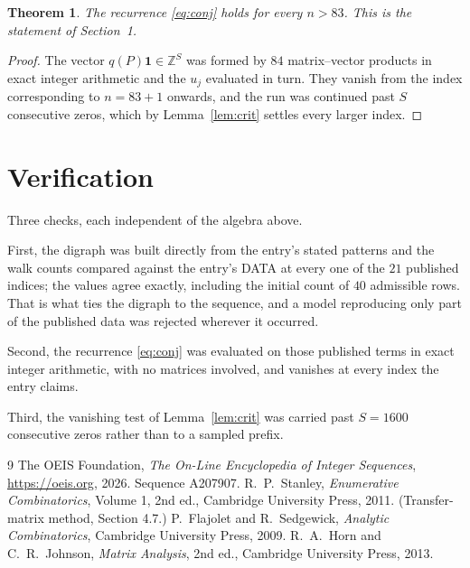 \documentclass[11pt,a4paper]{article}
\theoremstyle{plain}
\newtheorem{theorem}{Theorem}
\theoremstyle{definition}
\begin{document}
\begin{theorem}
The recurrence \eqref{eq:conj} holds for every $n>83$. This is the statement of
Section~1.
\end{theorem}

\begin{proof}
The vector $q(P)\mathbf{1}\in\mathbb{Z}^{S}$ was formed by $84$ matrix--vector
products in exact integer arithmetic and the $u_j$ evaluated in turn. They vanish from the
index corresponding to $n=83+1$ onwards, and the run was continued past $S$ consecutive
zeros, which by Lemma~\ref{lem:crit} settles every larger index.
\end{proof}

\section{Verification}

Three checks, each independent of the algebra above.

First, the digraph was built directly from the entry's stated patterns and the walk counts
compared against the entry's DATA at every one of the $21$ published indices; the
values agree exactly, including the initial count of $40$ admissible rows. That is
what ties the digraph to the sequence, and a model reproducing only part of the published
data was rejected wherever it occurred.

Second, the recurrence \eqref{eq:conj} was evaluated on those published terms in exact
integer arithmetic, with no matrices involved, and vanishes at every index the entry claims.

Third, the vanishing test of Lemma~\ref{lem:crit} was carried past $S=1600$ consecutive
zeros rather than to a sampled prefix.

\begin{thebibliography}{9}
 The OEIS Foundation, \emph{The On-Line Encyclopedia of Integer
Sequences}, \url{https://oeis.org}, 2026. Sequence A207907.
 R.~P.~Stanley, \emph{Enumerative Combinatorics}, Volume 1, 2nd ed.,
Cambridge University Press, 2011. (Transfer-matrix method, Section 4.7.)
 P.~Flajolet and R.~Sedgewick, \emph{Analytic Combinatorics}, Cambridge
University Press, 2009.
 R.~A.~Horn and C.~R.~Johnson, \emph{Matrix Analysis}, 2nd ed., Cambridge
University Press, 2013.
\end{thebibliography}
\end{document}
